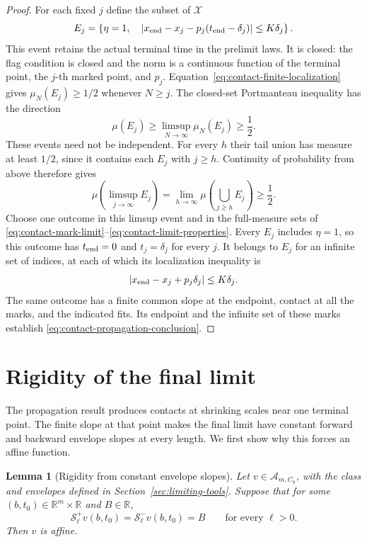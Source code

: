 \documentclass[11pt]{article}
\numberwithin{equation}{section}
\newtheorem{lemma}[theorem]{Lemma}
\theoremstyle{definition}
\theoremstyle{remark}
\newcommand{\R}{\mathbb{R}}
\newcommand{\Senv}{\mathcal{S}}
\newcommand{\Aclass}{\mathcal{A}}
\begin{document}
\begin{proof}
For each fixed $j$ define the subset of $\mathcal X$
\[
  E_j=\left\{\eta=1,\quad
      |x_{\rm end}-x_j-p_j(t_{\rm end}-\delta_j)|\le K\delta_j\right\}.
\]
This event retains the actual terminal time in the prelimit laws.
It is closed: the flag condition is closed and the norm is a continuous
function of the terminal point, the $j$-th marked point, and $p_j$.
Equation~\eqref{eq:contact-finite-localization} gives
$\mu_N(E_j)\ge1/2$ whenever $N\ge j$.  The
closed-set Portmanteau inequality has the direction
\[
  \mu(E_j)\ge\limsup_{N\to\infty}\mu_N(E_j)\ge\frac12.
\]
These events need not be independent.  For every $h$ their tail union has
measure at least $1/2$, since it contains each $E_j$ with $j\ge h$.  Continuity of
probability from above therefore gives
\[
  \mu\left(\limsup_{j\to\infty}E_j\right)
   =\lim_{h\to\infty}\mu\left(\bigcup_{j\ge h}E_j\right)\ge\frac12.
\]
Choose one outcome in this limsup event and in the full-measure sets of
\eqref{eq:contact-mark-limit}--\eqref{eq:contact-limit-properties}.  Every
$E_j$ includes $\eta=1$, so this outcome has $t_{\rm end}=0$ and
$t_j=\delta_j$ for every $j$.  It belongs to $E_j$ for an infinite set of
indices, at each of which its localization inequality is
\[
  |x_{\rm end}-x_j+p_j\delta_j|\le K\delta_j.
\]
The same outcome has a finite common slope at the endpoint, contact at all
the marks, and the indicated fits.  Its endpoint and the infinite set of
these marks establish \eqref{eq:contact-propagation-conclusion}.
\end{proof}

\section{Rigidity of the final limit}\label{sec:rigidity}

The propagation result produces contacts at shrinking scales near one terminal point. The finite slope at that point makes the final limit have constant forward and backward envelope slopes at every length. We first show why this forces an affine function.

\begin{lemma}[Rigidity from constant envelope slopes]\label{lem:slope-rigidity}
Let $v\in\Aclass_{m,C_0}$, with the class and envelopes defined in Section~\ref{sec:limiting-tools}. Suppose that for some $(b,t_0)\in\R^m\times\R$ and $B\in\R$,
\begin{equation}\label{eq:constant-envelope-slopes}
  \Senv_\ell^+v(b,t_0)=\Senv_\ell^-v(b,t_0)=B
       \qquad\text{for every }\ell>0.
\end{equation}
Then $v$ is affine.
\end{lemma}
\end{document}
